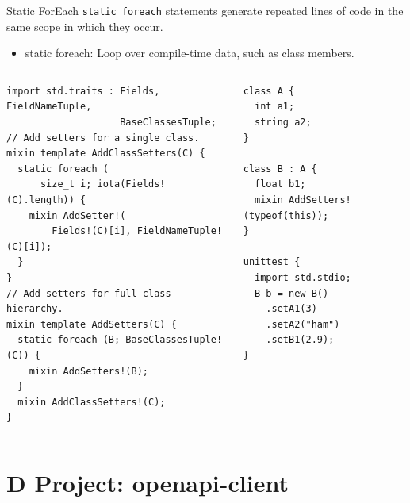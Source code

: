 \documentclass[bigger]{beamer}
\begin{document}
\begin{frame}[label={sec:orgc8a5a55},fragile]{Static ForEach}
 \texttt{static foreach} statements generate repeated lines of code in the same scope in which they occur.
\begin{itemize}
\item \alert{static foreach}: Loop over compile-time data, such as class members.
\end{itemize}

\begin{columns}
\begin{column}{0.6\columnwidth}
\scriptsize
\begin{verbatim}
import std.traits : Fields, FieldNameTuple,
                    BaseClassesTuple;
// Add setters for a single class.
mixin template AddClassSetters(C) {
  static foreach (
      size_t i; iota(Fields!(C).length)) {
    mixin AddSetter!(
        Fields!(C)[i], FieldNameTuple!(C)[i]);
  }
}
// Add setters for full class hierarchy.
mixin template AddSetters(C) {
  static foreach (B; BaseClassesTuple!(C)) {
    mixin AddSetters!(B);
  }
  mixin AddClassSetters!(C);
}
\end{verbatim}
\end{column}

\begin{column}{0.4\columnwidth}
\scriptsize
\begin{verbatim}
class A {
  int a1;
  string a2;
}

class B : A {
  float b1;
  mixin AddSetters!(typeof(this));
}

unittest {
  import std.stdio;
  B b = new B()
    .setA1(3)
    .setA2("ham")
    .setB1(2.9);
}
\end{verbatim}
\end{column}
\end{columns}
\end{frame}

\section{D Project: openapi-client}
\label{sec:org3282a23}
\end{document}
